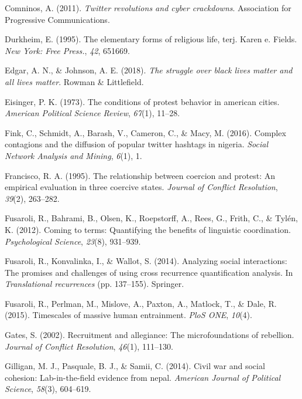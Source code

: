 \documentclass[
  english,
  man]{apa6}
\begin{document}
\leavevmode\hypertarget{ref-comninos2011twitter}{}%
Comninos, A. (2011). \emph{Twitter revolutions and cyber crackdowns}. Association for Progressive Communications.

\leavevmode\hypertarget{ref-durkheim1995elementary}{}%
Durkheim, E. (1995). The elementary forms of religious life, terj. Karen e. Fields. \emph{New York: Free Press.}, \emph{42}, 651669.

\leavevmode\hypertarget{ref-edgar2018struggle}{}%
Edgar, A. N., \& Johnson, A. E. (2018). \emph{The struggle over black lives matter and all lives matter}. Rowman \& Littlefield.

\leavevmode\hypertarget{ref-eisinger1973conditions}{}%
Eisinger, P. K. (1973). The conditions of protest behavior in american cities. \emph{American Political Science Review}, \emph{67}(1), 11--28.

\leavevmode\hypertarget{ref-fink2016complex}{}%
Fink, C., Schmidt, A., Barash, V., Cameron, C., \& Macy, M. (2016). Complex contagions and the diffusion of popular twitter hashtags in nigeria. \emph{Social Network Analysis and Mining}, \emph{6}(1), 1.

\leavevmode\hypertarget{ref-francisco1995relationship}{}%
Francisco, R. A. (1995). The relationship between coercion and protest: An empirical evaluation in three coercive states. \emph{Journal of Conflict Resolution}, \emph{39}(2), 263--282.

\leavevmode\hypertarget{ref-fusaroli2012coming}{}%
Fusaroli, R., Bahrami, B., Olsen, K., Roepstorff, A., Rees, G., Frith, C., \& Tylén, K. (2012). Coming to terms: Quantifying the benefits of linguistic coordination. \emph{Psychological Science}, \emph{23}(8), 931--939.

\leavevmode\hypertarget{ref-fusaroli2014analyzing}{}%
Fusaroli, R., Konvalinka, I., \& Wallot, S. (2014). Analyzing social interactions: The promises and challenges of using cross recurrence quantification analysis. In \emph{Translational recurrences} (pp. 137--155). Springer.

\leavevmode\hypertarget{ref-fusaroli2015timescales}{}%
Fusaroli, R., Perlman, M., Mislove, A., Paxton, A., Matlock, T., \& Dale, R. (2015). Timescales of massive human entrainment. \emph{PloS ONE}, \emph{10}(4).

\leavevmode\hypertarget{ref-gates2002recruitment}{}%
Gates, S. (2002). Recruitment and allegiance: The microfoundations of rebellion. \emph{Journal of Conflict Resolution}, \emph{46}(1), 111--130.

\leavevmode\hypertarget{ref-gilligan2014civil}{}%
Gilligan, M. J., Pasquale, B. J., \& Samii, C. (2014). Civil war and social cohesion: Lab-in-the-field evidence from nepal. \emph{American Journal of Political Science}, \emph{58}(3), 604--619.
\end{document}
